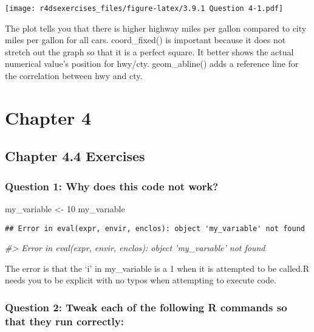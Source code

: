 \documentclass[
]{book}
\newenvironment{Shaded}{\begin{snugshade}}{\end{snugshade}}
\newcommand{\CommentTok}[1]{\textcolor[rgb]{0.56,0.35,0.01}{\textit{#1}}}
\newcommand{\DecValTok}[1]{\textcolor[rgb]{0.00,0.00,0.81}{#1}}
\newcommand{\NormalTok}[1]{#1}
\newcommand{\StringTok}[1]{\textcolor[rgb]{0.31,0.60,0.02}{#1}}
\begin{document}
\texttt{[image: r4dsexercises\_files/figure-latex/3.9.1 Question 4-1.pdf]}

The plot tells you that there is higher highway miles per gallon compared to city miles per gallon for all cars.
coord\_fixed() is important because it does not stretch out the graph so that it is a perfect square. It better shows the actual numerical value's position for hwy/cty.
geom\_abline() adds a reference line for the correlation between hwy and cty.

\hypertarget{chapter-4}{%
\chapter{Chapter 4}\label{chapter-4}}

\hypertarget{chapter-4.4-exercises}{%
\section{Chapter 4.4 Exercises}\label{chapter-4.4-exercises}}

\hypertarget{question-1-why-does-this-code-not-work}{%
\subsection{Question 1: Why does this code not work?}\label{question-1-why-does-this-code-not-work}}

\begin{Shaded}
\begin{Highlighting}[]
\NormalTok{my_variable <-}\StringTok{ }\DecValTok{10}
\NormalTok{my_varıable}
\end{Highlighting}
\end{Shaded}

\begin{verbatim}
## Error in eval(expr, envir, enclos): object 'my_varıable' not found
\end{verbatim}

\begin{Shaded}
\begin{Highlighting}[]
\CommentTok{#> Error in eval(expr, envir, enclos): object 'my_varıable' not found}
\end{Highlighting}
\end{Shaded}

The error is that the `i' in my\_variable is a 1 when it is attempted to be called.R needs you to be explicit with no typos when attempting to execute code.

\hypertarget{question-2-tweak-each-of-the-following-r-commands-so-that-they-run-correctly}{%
\subsection{Question 2: Tweak each of the following R commands so that they run correctly:}\label{question-2-tweak-each-of-the-following-r-commands-so-that-they-run-correctly}}
\end{document}
